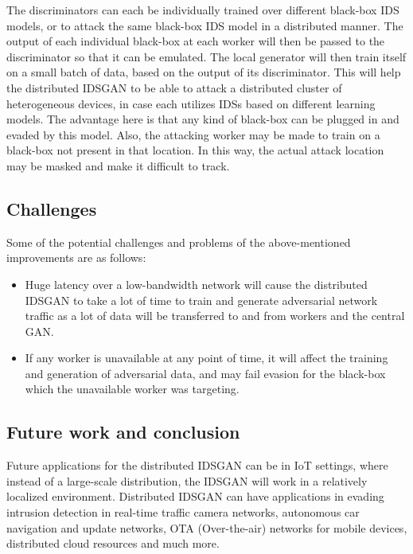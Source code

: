 \documentclass[10pt, conference, compsocconf]{IEEEtran}
\begin{document}
The discriminators can each be individually trained over different black-box IDS models, or to attack the same black-box IDS model in a distributed manner. The output of each individual black-box at each worker will then be passed to the discriminator so that it can be emulated. The local generator will then train itself on a small batch of data, based on the output of its discriminator. This will help the distributed IDSGAN to be able to attack a distributed cluster of heterogeneous devices, in case each utilizes IDSs based on different learning models. The advantage here is that any kind of black-box can be plugged in and evaded by this model. Also, the attacking worker may be made to train on a black-box not present in that location. In this way, the actual attack location may be masked and make it difficult to track.

\subsection {Challenges}

Some of the potential challenges and problems of the above-mentioned improvements are as follows:

\begin{itemize}

\item Huge latency over a low-bandwidth network will cause the distributed IDSGAN to take a lot of time to train and generate adversarial network traffic as a lot of data will be transferred to and from workers and the central GAN.

\item If any worker is unavailable at any point of time, it will affect the training and generation of adversarial data, and may fail evasion for the black-box which the unavailable worker was targeting.

\end{itemize}

\subsection {Future work and conclusion}
Future applications for the distributed IDSGAN can be in IoT settings, where instead of a large-scale distribution, the IDSGAN will work in a relatively localized environment. Distributed IDSGAN can have applications in evading intrusion detection in real-time traffic camera networks, autonomous car navigation and update networks, OTA (Over-the-air) networks for mobile devices, distributed cloud resources and much more.
\end{document}
